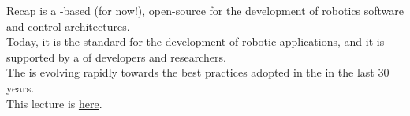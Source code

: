 
\begin{frame}{Recap}
   is a -based (for now!), open-source  for the development of robotics software and  control architectures.\\
  \bigskip
  Today, it is the  standard for the development of robotic applications, and it is supported by a  of developers and researchers.\\
  \bigskip
  The  is evolving rapidly towards the best practices adopted in the  in the last 30 years.\\
  \bigskip
  This lecture is \href{https://github.com/robmasocco/DAFN24_Robotics_2}{\color{blue}\underline{here}}.
\end{frame}
